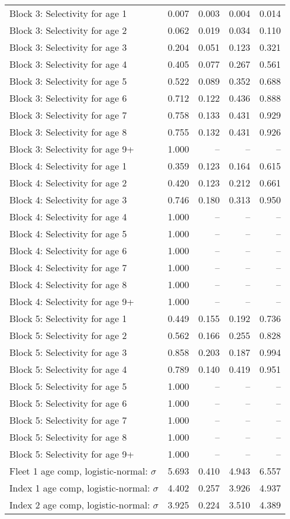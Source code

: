 \documentclass[
]{article}
\begin{document}
\begin{landscape}
\begin{longtable}[t]{lrrrr}
\addlinespace
Block 3: Selectivity for age 1 & 0.007 & 0.003 & 0.004 & 0.014\\
Block 3: Selectivity for age 2 & 0.062 & 0.019 & 0.034 & 0.110\\
Block 3: Selectivity for age 3 & 0.204 & 0.051 & 0.123 & 0.321\\
Block 3: Selectivity for age 4 & 0.405 & 0.077 & 0.267 & 0.561\\
Block 3: Selectivity for age 5 & 0.522 & 0.089 & 0.352 & 0.688\\
\addlinespace
Block 3: Selectivity for age 6 & 0.712 & 0.122 & 0.436 & 0.888\\
Block 3: Selectivity for age 7 & 0.758 & 0.133 & 0.431 & 0.929\\
Block 3: Selectivity for age 8 & 0.755 & 0.132 & 0.431 & 0.926\\
Block 3: Selectivity for age 9+ & 1.000 & -- & -- & --\\
Block 4: Selectivity for age 1 & 0.359 & 0.123 & 0.164 & 0.615\\
\addlinespace
Block 4: Selectivity for age 2 & 0.420 & 0.123 & 0.212 & 0.661\\
Block 4: Selectivity for age 3 & 0.746 & 0.180 & 0.313 & 0.950\\
Block 4: Selectivity for age 4 & 1.000 & -- & -- & --\\
Block 4: Selectivity for age 5 & 1.000 & -- & -- & --\\
Block 4: Selectivity for age 6 & 1.000 & -- & -- & --\\
\addlinespace
Block 4: Selectivity for age 7 & 1.000 & -- & -- & --\\
Block 4: Selectivity for age 8 & 1.000 & -- & -- & --\\
Block 4: Selectivity for age 9+ & 1.000 & -- & -- & --\\
Block 5: Selectivity for age 1 & 0.449 & 0.155 & 0.192 & 0.736\\
Block 5: Selectivity for age 2 & 0.562 & 0.166 & 0.255 & 0.828\\
\addlinespace
Block 5: Selectivity for age 3 & 0.858 & 0.203 & 0.187 & 0.994\\
Block 5: Selectivity for age 4 & 0.789 & 0.140 & 0.419 & 0.951\\
Block 5: Selectivity for age 5 & 1.000 & -- & -- & --\\
Block 5: Selectivity for age 6 & 1.000 & -- & -- & --\\
Block 5: Selectivity for age 7 & 1.000 & -- & -- & --\\
\addlinespace
Block 5: Selectivity for age 8 & 1.000 & -- & -- & --\\
Block 5: Selectivity for age 9+ & 1.000 & -- & -- & --\\
Fleet 1 age comp, logistic-normal: $\sigma$ & 5.693 & 0.410 & 4.943 & 6.557\\
Index 1 age comp, logistic-normal: $\sigma$ & 4.402 & 0.257 & 3.926 & 4.937\\
Index 2 age comp, logistic-normal: $\sigma$ & 3.925 & 0.224 & 3.510 & 4.389\\*
\end{longtable}
\end{landscape}
\end{document}
